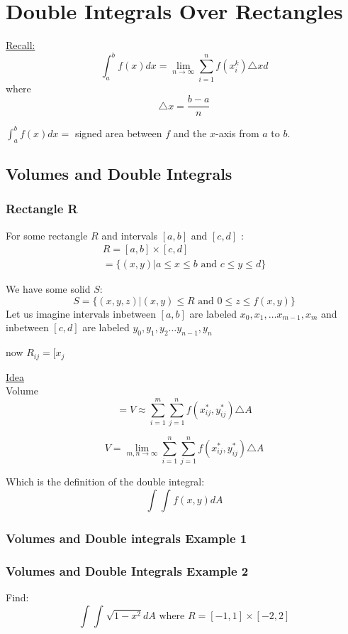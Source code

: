 \documentclass[12pt]{article}
\begin{document}
\section{Double Integrals Over Rectangles}
\underline{Recall:} 
\[\int_{a}^{b} f(x)dx = \lim_{n \to \infty} \sum_{i=1}^{n} f(x_i^k)\triangle xd\] 
where 
\[\triangle x = \frac{b-a}{n}\]

\(\int_{a}^{b} f(x)dx = \) signed area between \(f\) and the \(x\)-axis from \(a\) to \(b\).

\subsection{Volumes and Double Integrals}
\subsubsection{Rectangle R}
For some rectangle \(R\) and intervals \([a,b]\) and \([c,d]\) :
\begin{align*}
	\label{eq:Volume on interval}
	R = [a,b] \times  [c,d]\\
	 = \{(x,y)|a \leq x \leq b \text{ and } c \leq y \leq d\}
\end{align*}

We have some solid \(S\):
\[
	S = \{(x,y,z)|(x,y) \leq R \text{ and } 0 \leq z \leq f(x,y)\}
\]
Let us imagine intervals inbetween \([a,b]\) are labeled \(x_0,x_1, \hdots x_{m-1}, x_m\) and inbetween \([c,d]\) are labeled \(y_0, y_1, y_2 \hdots y_{n-1}, y_n\)

now \(R_{ij} = [x_j \) %

\underline{Idea}\\
Volume \[ = V \approx \sum_{i=1}^{m} \sum_{j=1}^{n} f(x_{ij} ^ *, y_{ij}^*) \triangle A\]

\[
	V = \lim_{m,n \to \infty} \sum_{i=1}^{n} \sum_{j=1}^{n} f(x_{ij}^*, y_{ij}^*) \triangle A
\]

Which is the definition of the double integral: 
\[\int_{}^{} \int_{}^{} f(x,y)dA\]

\subsubsection{Volumes and Double integrals Example 1}

\subsubsection{Volumes and Double Integrals Example 2}
Find: \[
	\int_{}^{} \int_{}^{} \sqrt{1-x^2} dA \text{ where } R = [-1,1] \times [-2,2]
\]
\end{document}
